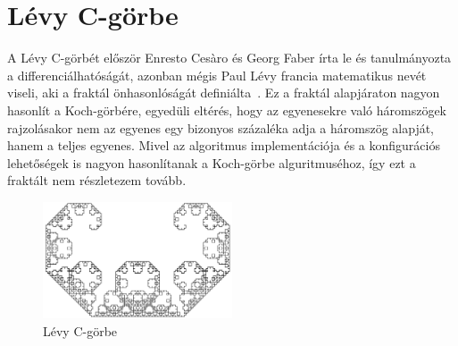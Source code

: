 \section{Lévy C-görbe}
A Lévy C-görbét először Enresto Cesàro és Georg Faber írta le és tanulmányozta a differenciálhatóságát, azonban mégis Paul Lévy francia matematikus nevét viseli, aki a fraktál önhasonlóságát definiálta~\cite{levy-c-wiki}. Ez a fraktál alapjáraton nagyon hasonlít a Koch-görbére, egyedüli eltérés, hogy az egyenesekre való háromszögek rajzolásakor nem az egyenes egy bizonyos százaléka adja a háromszög alapját, hanem a teljes egyenes. Mivel az algoritmus implementációja és a konfigurációs lehetőségek is nagyon hasonlítanak a Koch-görbe alguritmuséhoz, így ezt a fraktált nem részletezem tovább.
\begin{figure}[!ht]
	\begin{center}
		\includegraphics[width=0.5\textwidth]{img/LevyCCurve}
		\caption[labelInTOC]{Lévy C-görbe}
	\end{center}
\end{figure}
